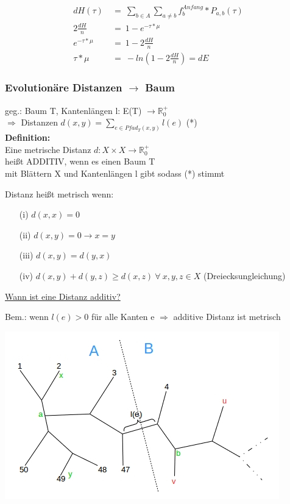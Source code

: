 \begin{align*}
 	dH(\tau) ~&=~ \sum \limits_{b \in A} \sum \limits_{a \neq b}  f_b^{Anfang} * P_{a,b}(\tau)\\
 	2 \frac{dH}{n} ~&=~ 1 - e^{-\tau * \mu}\\
 	e^{-\tau * \mu} ~&=~ 1 - 2 \frac{dH}{n}\\
 	\tau * \mu ~&=~ -ln (1 - 2 \frac{dH}{n}) = dE
\end{align*} 

\subsubsection{Evolutionäre Distanzen $\rightarrow$ Baum}
geg.: Baum T, Kantenlängen l: E(T) $\rightarrow \mathbb {R}_0^+$\\

\hspace{2cm} $\Rightarrow$ Distanzen $d(x,y) = \sum \limits_{e \in Pfad_T (x,y)} l(e)$ \color{orange}(*)\color{black}\\

\textbf{Definition:}\\
Eine metrische Distanz $d: X \times X \rightarrow \mathbb {R}_0^+$ \\
heißt ADDITIV, wenn es einen Baum T\\
mit Blättern X und Kantenlängen l gibt sodass \color{orange}(*)\color{black} stimmt	

Distanz heißt metrisch wenn:
\begin{itemize}
	\item[(i)] $d(x,x) = 0$
	\item[(ii)] $d(x,y) = 0 \rightarrow x = y$
	\item[(iii)] $d(x,y) = d(y,x)$
	\item[(iv)] $d(x,y) + d(y,z) \geq d(x,z)\ \forall\ x, y, z \in X$ (Dreiecksungleichung)
\end{itemize}

\newpage
\underline{Wann ist eine Distanz additiv?}

Bem.: wenn $l(e) > 0$ für alle Kanten e $\Rightarrow$ additive Distanz ist metrisch

\begin{center}
	\includegraphics[scale=1]{lectures/161209/pix/pic5.jpg}
\end{center}

